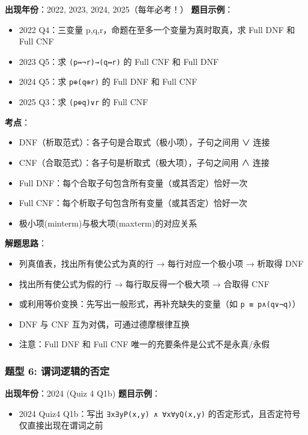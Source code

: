 \documentclass[10pt,a4paper,openany]{ctexbook}
\theoremstyle{definition}
\theoremstyle{remark}
\begin{document}
\textbf{出现年份}：2022, 2023, 2024, 2025（每年必考！）
\textbf{题目示例}：
\begin{itemize}
\item 2022 Q4：三变量 p,q,r，命题在至多一个变量为真时取真，求 Full DNF 和 Full CNF
\item 2023 Q5：求 \texttt{(p↔¬r)→(q↔r)} 的 Full CNF 和 Full DNF
\item 2024 Q5：求 \texttt{p⊕(q⊕r)} 的 Full DNF 和 Full CNF
\item 2025 Q3：求 \texttt{(p⊕q)∨r} 的 Full CNF

\end{itemize}

\textbf{考点}：
\begin{itemize}
\item DNF（析取范式）：各子句是合取式（极小项），子句之间用 ∨ 连接
\item CNF（合取范式）：各子句是析取式（极大项），子句之间用 ∧ 连接
\item Full DNF：每个合取子句包含所有变量（或其否定）恰好一次
\item Full CNF：每个析取子句包含所有变量（或其否定）恰好一次
\item 极小项(minterm)与极大项(maxterm)的对应关系

\end{itemize}

\textbf{解题思路}：
\begin{itemize}
\item 列真值表，找出所有使公式为真的行 → 每行对应一个极小项 → 析取得 DNF
\item 找出所有使公式为假的行 → 每行取反得一个极大项 → 合取得 CNF
\item 或利用等价变换：先写出一般形式，再补充缺失的变量（如 \texttt{p ≡ p∧(q∨¬q)}）
\item DNF 与 CNF 互为对偶，可通过德摩根律互换
\item 注意：Full DNF 和 Full CNF 唯一的充要条件是公式不是永真/永假

\end{itemize}

\vspace{-2pt}

\subsubsection{题型 6: 谓词逻辑的否定}

\textbf{出现年份}：2024 (Quiz 4 Q1b)
\textbf{题目示例}：
\begin{itemize}
\item 2024 Quiz4 Q1b：写出 \texttt{∃x∃yP(x,y) ∧ ∀x∀yQ(x,y)} 的否定形式，且否定符号仅直接出现在谓词之前

\end{itemize}
\end{document}
